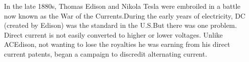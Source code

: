 \documentclass[preview]{standalone}
\begin{document}
\centering In the late 1880s, Thomas Edison and Nikola Tesla were embroiled in a battle now known as the War of the Currents.\newline During the early years of electricity, DC (created by Edison) was the standard in the U.S.\newline But there was one problem. Direct current is not easily converted to higher or lower voltages. Unlike AC\newline Edison, not wanting to lose the royalties he was earning from his direct current patents, began a campaign to discredit alternating current.
\end{document}
